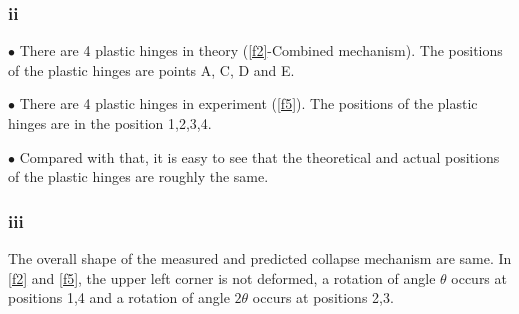 \subsubsection*{ii}

$\bullet$ There are 4 plastic hinges in theory (\autoref{f2}-Combined mechanism). The positions of the plastic hinges are points A, C, D and E.

$\bullet$ There are 4 plastic hinges in experiment (\autoref{f5}). The positions of the plastic hinges are in the position 1,2,3,4.

$\bullet$ Compared with that, it is easy to see that the theoretical and actual positions of the plastic hinges are roughly the same.

\subsubsection*{iii}

The overall shape of the measured and predicted collapse mechanism are same. In \autoref{f2} and \autoref{f5}, the upper left corner is not deformed, a rotation of angle $\theta$ occurs at positions 1,4 and a rotation of angle $2\theta$ occurs at positions 2,3.
\fi